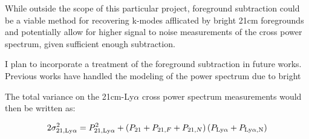 While outside the scope of this particular project, foreground subtraction could
be a viable method for recovering k-modes afflicated by bright 21cm foregrounds
and potentially allow for higher signal to noise measurements of the cross power
spectrum, given sufficient enough subtraction.

I plan to incorporate a treatment of the foreground subtraction in future works.
Previous works have handled the modeling of the power spectrum due to bright

The total variance on the 21cm-Ly$\alpha$ cross power spectrum measurements would
then be written as:

\begin{equation}
    2 \sigma^2_{21, \rm Ly\alpha} = P^2_{21, \rm Ly\alpha} +
      \left(P_{21} + P_{21, F} + P_{21, N} \right) \left( P_{\rm Ly\alpha} + P_{\text{Ly}\alpha, \text{N}}\right)
\end{equation}
